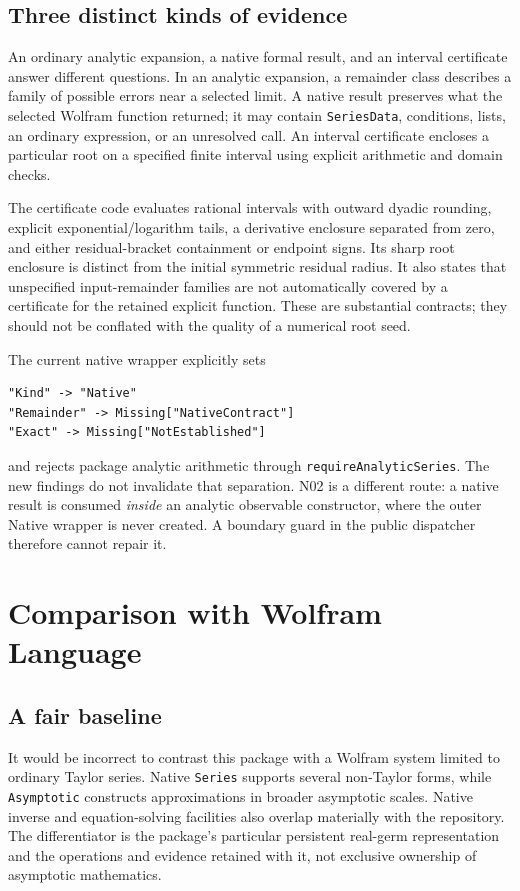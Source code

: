 \documentclass[11pt,letterpaper]{article}
\newcommand{\code}[1]{\nolinkurl{#1}}
\begin{document}
\subsection{Three distinct kinds of evidence}
An ordinary analytic expansion, a native formal result, and an interval
certificate answer different questions. In an analytic expansion, a remainder
class describes a family of possible errors near a selected limit. A native
result preserves what the selected Wolfram function returned; it may contain
\code{SeriesData}, conditions, lists, an ordinary expression, or an unresolved
call. An interval certificate encloses a particular root on a specified finite
interval using explicit arithmetic and domain checks.~\cite{nativecontracts,certificates}

The certificate code evaluates rational intervals with outward dyadic rounding,
explicit exponential/logarithm tails, a derivative enclosure separated from
zero, and either residual-bracket containment or endpoint signs. Its sharp
root enclosure is distinct from the initial symmetric residual radius. It also
states that unspecified input-remainder families are not automatically covered
by a certificate for the retained explicit function. These are substantial
contracts; they should not be conflated with the quality of a numerical root
seed.~\cite{certificates}

The current native wrapper explicitly sets
\begin{lstlisting}
"Kind" -> "Native"
"Remainder" -> Missing["NativeContract"]
"Exact" -> Missing["NotEstablished"]
\end{lstlisting}
and rejects package analytic arithmetic through \code{requireAnalyticSeries}.
The new findings do not invalidate that separation. N02 is a different route:
a native result is consumed \emph{inside} an analytic observable constructor,
where the outer Native wrapper is never created. A boundary guard in the
public dispatcher therefore cannot repair it.~\cite{compatibility,operations}

\section{Comparison with Wolfram Language}
\subsection{A fair baseline}
It would be incorrect to contrast this package with a Wolfram system limited
to ordinary Taylor series. Native \code{Series} supports several non-Taylor
forms, while \code{Asymptotic} constructs approximations in broader asymptotic
scales. Native inverse and equation-solving facilities also overlap materially
with the repository. The differentiator is the package's particular persistent
real-germ representation and the operations and evidence retained with it,
not exclusive ownership of asymptotic mathematics.~\cite{wl-series,wl-asymptotic,wl-solve}
\end{document}
